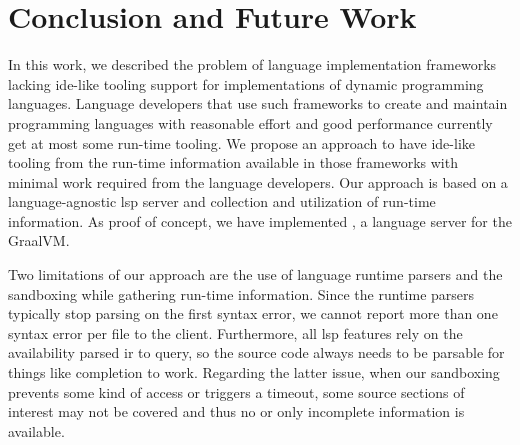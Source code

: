 \documentclass[sigplan,10pt,review,anonymous]{acmart}
\begin{document}

\section{Conclusion and Future Work}
\label{cha:conclusion}

In this work, we described the problem of language implementation frameworks
lacking \ac{ide}-like tooling support for implementations of dynamic programming
languages. Language developers that use such frameworks to create and maintain
programming languages with reasonable effort and good performance currently get
at most some run-time tooling. We propose an approach to have \ac{ide}-like
tooling from the run-time information available in those frameworks with minimal
work required from the language developers. Our approach is based on a
language-agnostic \ac{lsp} server and collection and utilization of run-time
information. As proof of concept, we have implemented \graallsp, a language
server for the GraalVM.


Two limitations of our approach are the use of language runtime parsers and the
sandboxing while gathering run-time information. Since the runtime parsers
typically stop parsing on the first syntax error, we cannot report more than one
syntax error per file to the client. Furthermore, all \ac{lsp} features rely on
the availability parsed \ac{ir} to query, so the source code always needs to be
parsable for things like completion to work. Regarding the latter issue, when
our sandboxing prevents some kind of access or triggers a timeout, some source
sections of interest may not be covered and thus no or only incomplete
information is available.
\end{document}
